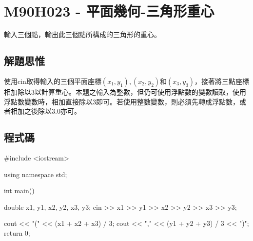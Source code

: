 \section{M90H023 - 平面幾何-三角形重心}
輸入三個點，輸出此三個點所構成的三角形的重心。
\subsection{解題思惟}
使用cin取得輸入的三個平面座標$(x_1, y_1), (x_2, y_2)$和$(x_3, y_3)$，接著將三點座標相加除以3以計算重心。本題之輸入為整數，但仍可使用浮點數的變數讀取，使用浮點數變數時，相加直接除以3即可。若使用整數變數，則必須先轉成浮點數，或者相加之後除以3.0亦可。

\subsection{程式碼}
\begin{cppcode}
#include <iostream>

using namespace std;

int main()
{
	double x1, y1, x2, y2, x3, y3;
	cin >> x1 >> y1 >> x2 >> y2 >> x3 >> y3;

	cout << "(" << (x1 + x2 + x3) / 3;
	cout << "," << (y1 + y2 + y3) / 3 << ")";	
	return 0;	    
}
\end{cppcode}
